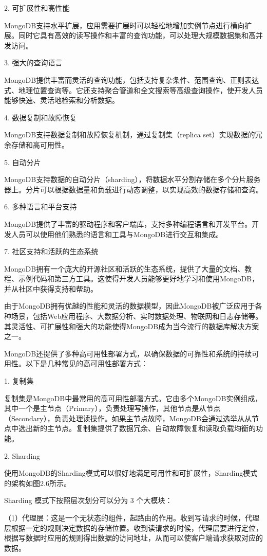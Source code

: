 2. 可扩展性和高性能

MongoDB支持水平扩展，应用需要扩展时可以轻松地增加实例节点进行横向扩展。同时它具有高效的读写操作和丰富的查询功能，可以处理大规模数据集和高并发访问。

3. 强大的查询语言

MongoDB提供丰富而灵活的查询功能，包括支持复杂条件、范围查询、正则表达式、地理位置查询等。它还支持聚合管道和全文搜索等高级查询操作，使开发人员能够快速、灵活地检索和分析数据。

4. 数据复制和故障恢复

MongoDB支持数据复制和故障恢复机制，通过复制集（replica set）实现数据的冗余存储和高可用性。

5. 自动分片

MongoDB支持数据的自动分片（sharding），将数据水平分割存储在多个分片服务器上。分片可以根据数据量和负载进行动态调整，以实现高效的数据存储和查询。

6. 多种语言和平台支持

MongoDB提供了丰富的驱动程序和客户端库，支持多种编程语言和开发平台。开发人员可以使用他们熟悉的语言和工具与MongoDB进行交互和集成。

7. 社区支持和活跃的生态系统

MongoDB拥有一个庞大的开源社区和活跃的生态系统，提供了大量的文档、教程、示例代码和第三方工具。这使得开发人员能够更好地学习和使用MongoDB，并从社区中获得支持和帮助。

由于MongoDB拥有优越的性能和灵活的数据模型，因此MongoDB被广泛应用于各种场景，包括Web应用程序、大数据分析、实时数据处理、物联网和日志存储等。其灵活性、可扩展性和强大的功能使得MongoDB成为当今流行的数据库解决方案之一。

MongoDB还提供了多种高可用性部署方式，以确保数据的可靠性和系统的持续可用性。以下是几种常见的高可用性部署方式：

1. 复制集

复制集是MongoDB中最常用的高可用性部署方式。它由多个MongoDB实例组成，其中一个是主节点（Primary），负责处理写操作，其他节点是从节点（Secondary），负责处理读操作。如果主节点故障，MongoDB会通过选举从从节点中选出新的主节点。复制集提供了数据冗余、自动故障恢复和读取负载均衡的功能。

2. Sharding

使用MongoDB的Sharding模式可以很好地满足可用性和可扩展性，Sharding模式的架构如图2.6所示。

Sharding 模式下按照层次划分可以分为 3 个大模块：

（1）代理层：这是一个无状态的组件，起路由的作用。收到写请求的时候，代理层根据一定的规则决定数据的存储位置。收到读请求的时候，代理层要进行定位，根据写数据时应用的规则得出数据的访问地址，从而可以使客户端请求获取对应的数据。

